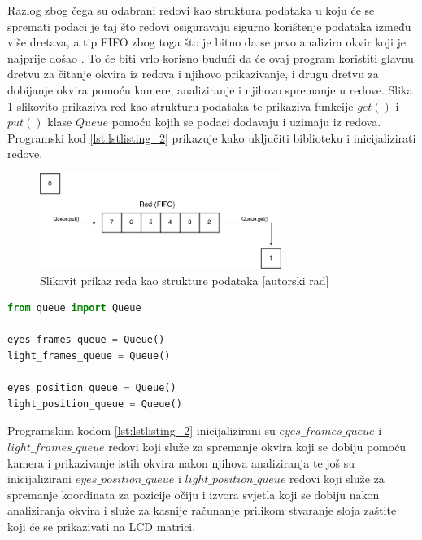 \documentclass{foi}
\begin{document}
Razlog zbog čega su odabrani redovi kao struktura podataka u koju će se spremati podaci je taj što redovi osiguravaju sigurno korištenje podataka između više dretava, a tip FIFO zbog toga što je bitno da se prvo analizira okvir koji je najprije došao \cite{PythonSoftwareFoundation}. To će biti vrlo korisno budući da će ovaj program koristiti glavnu dretvu za čitanje okvira iz redova i njihovo prikazivanje, i drugu dretvu za dobijanje okvira pomoću kamere, analiziranje i njihovo spremanje u redove. Slika \ref{fig:dijagram_red} slikovito prikaziva red kao strukturu podataka te prikaziva funkcije $get()$ i $put()$ klase $Queue$ pomoću kojih se podaci dodavaju i uzimaju iz redova. Programski kod \ref{lst:lstlisting_2} prikazuje kako uključiti biblioteku i inicijalizirati redove.

\begin{figure}[h!]
    \centering
    \includegraphics[width=0.7\textwidth]{slike/redovi_dijagram}
    \caption{Slikovit prikaz reda kao strukture podataka [autorski rad]}
    \label{fig:dijagram_red}
\end{figure}

\begin{lstlisting}[language=Python, label={lst:lstlisting_2}, firstnumber=4, style=colored, caption=Uključivanje biblioteke $queue$ i inicijaliziranje redova]
from queue import Queue

eyes_frames_queue = Queue()
light_frames_queue = Queue()

eyes_position_queue = Queue()
light_position_queue = Queue()
\end{lstlisting}

\newpage
Programskim kodom \ref{lst:lstlisting_2} inicijalizirani su  $eyes\_frames\_queue$ i $light\_frames\_queue$ redovi koji služe za spremanje okvira koji se dobiju pomoću kamera i prikazivanje istih okvira nakon njihova analiziranja te još su inicijalizirani $eyes\_position\_queue$ i $light\_position\_queue$ redovi koji služe za spremanje koordinata za pozicije očiju i izvora svjetla koji se dobiju nakon analiziranja okvira i služe za kasnije računanje prilikom stvaranje sloja zaštite koji će se prikazivati na LCD matrici.
\end{document}
